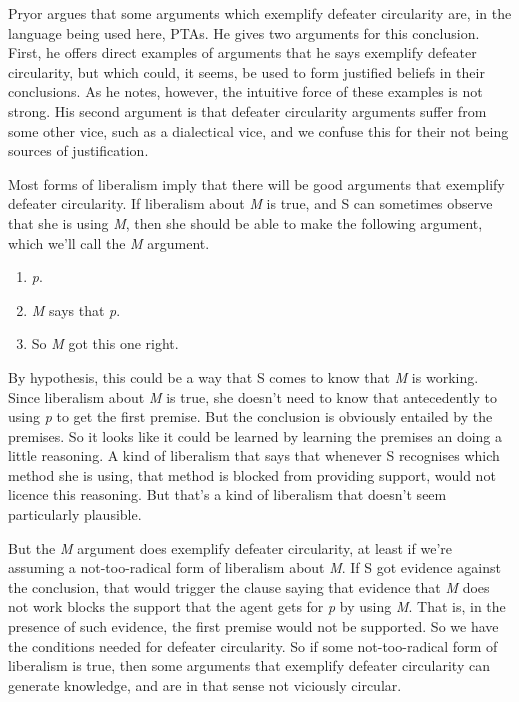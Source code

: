 \documentclass[
  10pt,
  letterpaper,
  twoside]{scrbook}
\providecommand{\tightlist}{%
  \setlength{\itemsep}{0pt}\setlength{\parskip}{0pt}}\usepackage{longtable,booktabs,array}
\begin{document}
Pryor argues that some arguments which exemplify defeater circularity
are, in the language being used here, PTAs. He gives two arguments for
this conclusion. First, he offers direct examples of arguments that he
says exemplify defeater circularity, but which could, it seems, be used
to form justified beliefs in their conclusions. As he notes, however,
the intuitive force of these examples is not strong. His second argument
is that defeater circularity arguments suffer from some other vice, such
as a dialectical vice, and we confuse this for their not being sources
of justification.

Most forms of liberalism imply that there will be good arguments that
exemplify defeater circularity. If liberalism about \emph{M} is true,
and S can sometimes observe that she is using \emph{M}, then she should
be able to make the following argument, which we'll call the \emph{M}
argument.

\begin{enumerate}
\def\labelenumi{\arabic{enumi}.}
\tightlist
\item
  \emph{p}.
\item
  \emph{M} says that \emph{p}.
\item
  So \emph{M} got this one right.
\end{enumerate}

By hypothesis, this could be a way that S comes to know that \emph{M} is
working. Since liberalism about \emph{M} is true, she doesn't need to
know that antecedently to using \emph{p} to get the first premise. But
the conclusion is obviously entailed by the premises. So it looks like
it could be learned by learning the premises an doing a little
reasoning. A kind of liberalism that says that whenever S recognises
which method she is using, that method is blocked from providing
support, would not licence this reasoning. But that's a kind of
liberalism that doesn't seem particularly plausible.

But the \emph{M} argument does exemplify defeater circularity, at least
if we're assuming a not-too-radical form of liberalism about \emph{M}.
If S got evidence against the conclusion, that would trigger the clause
saying that evidence that \emph{M} does not work blocks the support that
the agent gets for \emph{p} by using \emph{M}. That is, in the presence
of such evidence, the first premise would not be supported. So we have
the conditions needed for defeater circularity. So if some
not-too-radical form of liberalism is true, then some arguments that
exemplify defeater circularity can generate knowledge, and are in that
sense not viciously circular.
\end{document}
